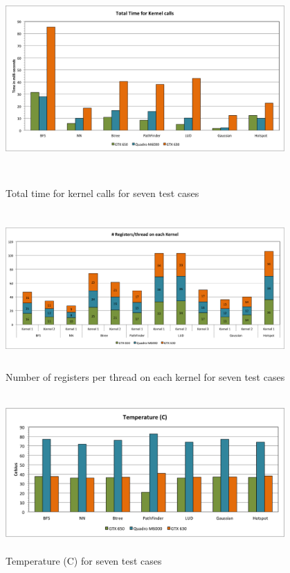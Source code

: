 \documentclass[paper=a4, fontsize=11pt]{scrartcl}
\numberwithin{equation}{section}		%
\numberwithin{figure}{section}			%
\numberwithin{table}{section}				%
\begin{document}
\begin{figure}[!h]
\centering
\includegraphics[width=0.95\textwidth,height=8cm]{../imgs/kernel_calls.png}
\caption{Total time for kernel calls for seven test cases}
\label{Total time for kernel calls for seven test cases }
\end{figure}

\begin{figure}[!h]
\centering
\includegraphics[width=0.95\textwidth,height=6cm]{../imgs/register_thread.png}
\caption{Number of registers per thread on each kernel for seven test cases}
\label{Number of registers per thread on each kernel for seven test cases}
\end{figure}

\begin{figure}[!h]
\centering
\includegraphics[width=0.95\textwidth,height=6cm]{../imgs/temp.png}
\caption{Temperature (C) for seven test cases}
\label{Temperature (C) for seven test cases}
\end{figure}
\end{document}
